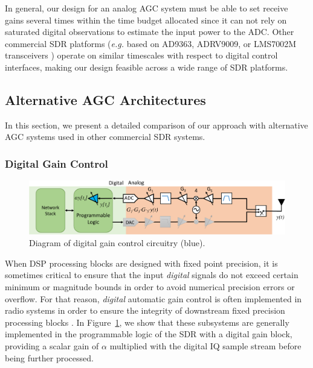 	In general, our design for an analog \ac{AGC} system must be able to set receive gains several times within the time budget allocated since it can not rely on saturated digital observations to estimate the input power to the \ac{ADC}.
	Other commercial \ac{SDR} platforms (\emph{e.g.} based on AD9363, ADRV9009, or LMS7002M transceivers \cite{adi2016ad9363, adi2018adrv9009, lime2018lms7002M}) operate on similar timescales with respect to digital control interfaces, making our design feasible across a wide range of SDR platforms.


\subsection{Alternative AGC Architectures}
\label{sec_agc_related}

In this section, we present a detailed comparison of our approach with alternative \ac{AGC} systems used in other commercial \ac{SDR} systems.

\subsubsection{Digital Gain Control}
\label{sec_agc_dig_alt}

\begin{figure}[h] %
\centering
\includegraphics[width=0.9\linewidth]{./figs/agc/agc_digital_diagrams}
\caption{Diagram of digital gain control circuitry (blue).}
\label{fig_dig_agc_diagram}
\end{figure}

	When \ac{DSP} processing blocks are designed with fixed point precision, it is sometimes critical to ensure that the input \emph{digital} signals do not exceed certain minimum or magnitude bounds in order to avoid numerical precision errors or overflow.
	For that reason, \emph{digital} automatic gain control is often implemented in radio systems in order to ensure the integrity of downstream fixed precision processing blocks \cite{lee2006agc}.
	In Figure~\ref{fig_dig_agc_diagram}, we show that these subsystems are generally implemented in the programmable logic of the \ac{SDR} with a digital gain block, providing a scalar gain of $\alpha$ multiplied with the digital IQ sample stream before being further processed. 
	
